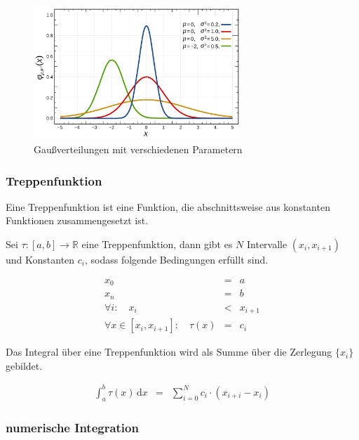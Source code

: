 \documentclass[12pt,a4paper]{scrartcl}
\numberwithin{equation}{section} %
\begin{document}
\begin{figure}[h]
	\centering
	\includegraphics[width=0.7\textwidth]{../media/B1.1/Gaussverteilungen.pdf}
	\caption{Gaußverteilungen mit verschiedenen Parametern \cite{abb:gaussians}}
	\label{abb:gaussians}
\end{figure}

\hypertarget{treppenfunktion}{%
\subsubsection{Treppenfunktion}\label{treppenfunktion}}

Eine Treppenfunktion ist eine Funktion, die abschnittsweise aus konstanten Funktionen zusammengesetzt ist.

Sei $\tau:[a,b]\rightarrow \mathbb R$ eine Treppenfunktion, dann gibt es $N$ Intervalle $(x_i, x_{i+1})$ und Konstanten $c_i$, sodass folgende Bedingungen erfüllt sind. \cite{Einsiedler}

\begin{eqnarray}
    x_0 &=& a \\
    x_n &=& b \\
    \forall i:\quad
        x_i &<& x_{i+1} \\
    \forall x\in[x_i, x_{i+1}]:\quad
        \tau(x) &=& c_i
\end{eqnarray}

\noindent
Das Integral über eine Treppenfunktion wird als Summe über die Zerlegung $\{x_i\}$ gebildet.

\begin{eqnarray}
    \int_a^b\tau(x)\,\mathrm dx
        &=& \sum_{i=0}^N c_i\cdot (x_{i+i}-x_i)
\end{eqnarray}

\hypertarget{numerische-integration}{%
\subsubsection{numerische Integration}\label{numerische-integration}}
\end{document}
